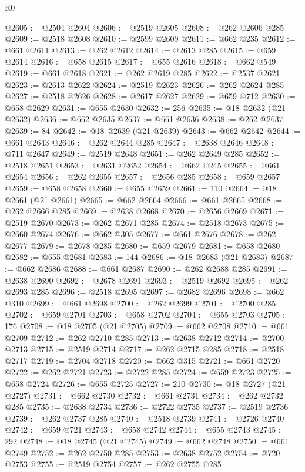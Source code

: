 \begin{lexlean}{R0}
\begin{coremodule}
@2605 := @2504 @2604
@2606 := @2519 @2605
@2608 := @262 @2606 @285
@2609 := @2518 @2608
@2610 := @2599 @2609
@2611 := @662 @235
@2612 := @661 @2611
@2613 := @262 @2612
@2614 := @2613 @285
@2615 := @659 @2614
@2616 := @658 @2615
@2617 := @655 @2616
@2618 := @662 @549
@2619 := @661 @2618
@2621 := @262 @2619 @285
@2622 := @2537 @2621
@2623 := @2613 @2622
@2624 := @2519 @2623
@2626 := @262 @2624 @285
@2627 := @2518 @2626
@2628 := @2617 @2627
@2629 := @659 @712
@2630 := @658 @2629
@2631 := @655 @2630
@2632 := 256
@2635 := @18 @2632 (@21 @2632)
@2636 := @662 @2635
@2637 := @661 @2636
@2638 := @262 @2637
@2639 := 84
@2642 := @18 @2639 (@21 @2639)
@2643 := @662 @2642
@2644 := @661 @2643
@2646 := @262 @2644 @285
@2647 := @2638 @2646
@2648 := @711 @2647
@2649 := @2519 @2648
@2651 := @262 @2649 @285
@2652 := @2518 @2651
@2653 := @2631 @2652
@2654 := @662 @245
@2655 := @661 @2654
@2656 := @262 @2655
@2657 := @2656 @285
@2658 := @659 @2657
@2659 := @658 @2658
@2660 := @655 @2659
@2661 := 110
@2664 := @18 @2661 (@21 @2661)
@2665 := @662 @2664
@2666 := @661 @2665
@2668 := @262 @2666 @285
@2669 := @2638 @2668
@2670 := @2656 @2669
@2671 := @2519 @2670
@2673 := @262 @2671 @285
@2674 := @2518 @2673
@2675 := @2660 @2674
@2676 := @662 @305
@2677 := @661 @2676
@2678 := @262 @2677
@2679 := @2678 @285
@2680 := @659 @2679
@2681 := @658 @2680
@2682 := @655 @2681
@2683 := 144
@2686 := @18 @2683 (@21 @2683)
@2687 := @662 @2686
@2688 := @661 @2687
@2690 := @262 @2688 @285
@2691 := @2638 @2690
@2692 := @2678 @2691
@2693 := @2519 @2692
@2695 := @262 @2693 @285
@2696 := @2518 @2695
@2697 := @2682 @2696
@2698 := @662 @310
@2699 := @661 @2698
@2700 := @262 @2699
@2701 := @2700 @285
@2702 := @659 @2701
@2703 := @658 @2702
@2704 := @655 @2703
@2705 := 176
@2708 := @18 @2705 (@21 @2705)
@2709 := @662 @2708
@2710 := @661 @2709
@2712 := @262 @2710 @285
@2713 := @2638 @2712
@2714 := @2700 @2713
@2715 := @2519 @2714
@2717 := @262 @2715 @285
@2718 := @2518 @2717
@2719 := @2704 @2718
@2720 := @662 @315
@2721 := @661 @2720
@2722 := @262 @2721
@2723 := @2722 @285
@2724 := @659 @2723
@2725 := @658 @2724
@2726 := @655 @2725
@2727 := 210
@2730 := @18 @2727 (@21 @2727)
@2731 := @662 @2730
@2732 := @661 @2731
@2734 := @262 @2732 @285
@2735 := @2638 @2734
@2736 := @2722 @2735
@2737 := @2519 @2736
@2739 := @262 @2737 @285
@2740 := @2518 @2739
@2741 := @2726 @2740
@2742 := @659 @721
@2743 := @658 @2742
@2744 := @655 @2743
@2745 := 292
@2748 := @18 @2745 (@21 @2745)
@2749 := @662 @2748
@2750 := @661 @2749
@2752 := @262 @2750 @285
@2753 := @2638 @2752
@2754 := @720 @2753
@2755 := @2519 @2754
@2757 := @262 @2755 @285

\end{coremodule}
\end{lexlean}
